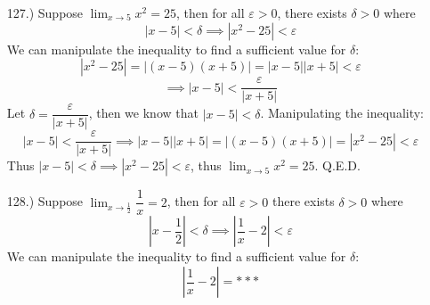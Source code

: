 \documentclass[12pt]{article}
\newcommand{\vertb}[1]{\left\vert#1\right\vert}
\newcommand{\e}{\varepsilon}
\newcommand{\lm}[1]{\displaystyle\lim_{#1}}
\begin{document}
\begin{itemize}
    \item [127.)] Suppose $\lm{x\to5}x^2=25$, then for all $\e>0$, there exists $\delta>0$ where
    \[\vertb{x-5}<\delta\implies\vertb{x^2-25}<\e\]
    We can manipulate the inequality to find a sufficient value for $\delta$:
    \[\vertb{x^2-25}=\vertb{(x-5)(x+5)}=\vertb{x-5}\vertb{x+5}<\e\]
    \[\implies\vertb{x-5}<\frac{\e}{\vertb{x+5}}\]
    Let $\delta=\dfrac{\e}{\vertb{x+5}}$, then we know that $\vertb{x-5}<\delta$. Manipulating the inequality:
    \[\vertb{x-5}<\frac{\varepsilon}{\vertb{x+5}}\implies\vertb{x-5}\vertb{x+5}=\vertb{(x-5)(x+5)}=\vertb{x^2-25}<\e\]
    Thus $\vertb{x-5}<\delta\implies\vertb{x^2-25}<\e$, thus $\lm{x\to5}x^2=25$. Q.E.D.

    \item [128.)] Suppose $\lm{x\to\frac{1}{2}}\dfrac{1}{x}=2$, then for all $\e>0$ there exists $\delta>0$ where
    \[\vertb{x-\frac{1}{2}}<\delta\implies\vertb{\frac{1}{x}-2}<\e\]
    We can manipulate the inequality to find a sufficient value for $\delta$:
    \[\vertb{\frac{1}{x}-2}=***\]



\end{itemize}
\end{document}
